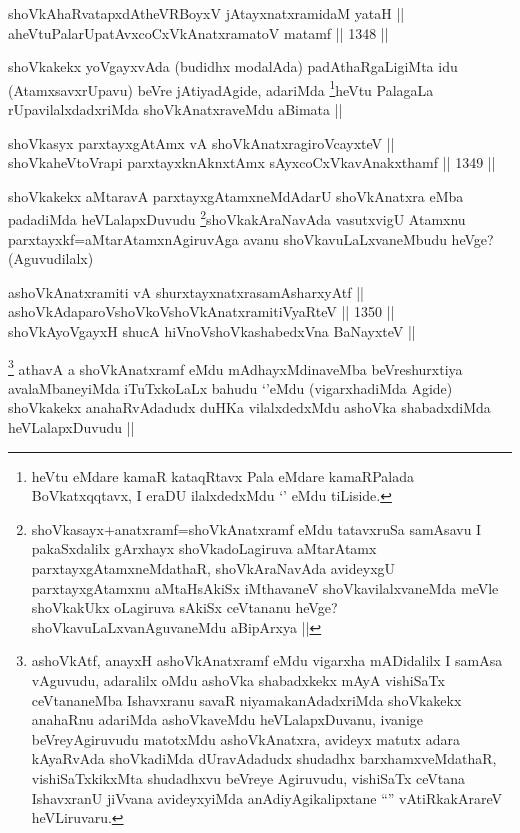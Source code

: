 
\begin{shl}
shoVkAhaRvatapxdAtheVRBoyxV jAtayxnatxramidaM yataH || \\
aheVtuPalarUpatAvxcoCxVkAnatxramatoV matamf ||  1348 ||  
\end{shl}

\begin{artha}
shoVkakekx yoVgayxvAda (budidhx modalAda) padAthaRgaLigiMta idu (AtamxsavxrUpavu) beVre jAtiyadAgide, adariMda \footnote{heVtu eMdare kamaR kataqRtavx Pala eMdare kamaRPalada BoVkatxqqtavx, I eraDU ilalxdedxMdu `\stext' eMdu tiLiside.}heVtu PalagaLa rUpavilalxdadxriMda shoVkAnatxraveMdu aBimata ||
\end{artha}


\begin{shl}
shoVkasyx parxtayxgAtAmx vA shoVkAnatxragiroVcayxteV || \\
shoVkaheVtoVrapi parxtayxknAknxtAmx sAyxcoCxVkavAnakxthamf ||  1349 ||  
\end{shl}

\begin{artha}
shoVkakekx aMtaravA parxtayxgAtamxneMdAdarU shoVkAnatxra eMba padadiMda heVLalapxDuvudu \footnote{shoVkasayx+anatxramf=shoVkAnatxramf eMdu tatavxruSa samAsavu I pakaSxdalilx gArxhayx shoVkadoLagiruva aMtarAtamx parxtayxgAtamxneMdathaR, shoVkAraNavAda avideyxgU parxtayxgAtamxnu aMtaHsAkiSx iMthavaneV shoVkavilalxvaneMda meVle shoVkakUkx oLagiruva sAkiSx  ceVtananu heVge? shoVkavuLaLxvanAguvaneMdu aBipArxya ||}shoVkakAraNavAda vasutxvigU Atamxnu parxtayxkf=aMtarAtamxnAgiruvAga avanu shoVkavuLaLxvaneMbudu heVge? (Aguvudilalx)
\end{artha}


\begin{shl}
ashoVkAnatxramiti vA shurxtayxnatxrasamAsharxyAtf ||  \\
ashoVkAdaparoV\s shoVkoV\s shoVkAnatxramitiVyaRteV ||  1350 ||  \\
shoVkAyoVgayxH shucA hiVnoV\s shoVkashabedxVna BaNayxteV || 
\end{shl}

\begin{artha}
\footnote{ashoVkAtf, anayxH ashoVkAnatxramf eMdu vigarxha mADidalilx I samAsa vAguvudu, adaralilx oMdu ashoVka shabadxkekx mAyA vishiSaTx ceVtananeMba Ishavxranu savaR niyamakanAdadxriMda shoVkakekx anahaRnu adariMda ashoVkaveMdu heVLalapxDuvanu, ivanige beVreyAgiruvudu matotxMdu ashoVkAnatxra, avideyx matutx adara kAyaRvAda shoVkadiMda dUravAdadudx shudadhx barxhamxveMdathaR, vishiSaTxkikxMta shudadhx\-vu beVreye Agiruvudu, vishiSaTx ceVtana IshavxranU jiVvana avideyxyiMda anAdiyAgikalipxtane ``\stext'' vAtiRkakArareV heVLiruvaru.}
athavA a shoVkAnatxramf eMdu mAdhayxMdinaveMba beVreshurxtiya avalaMbaneyiMda iTuTxkoLaLx bahudu `\stext'eMdu (vigarxhadiMda Agide) shoVkakekx anahaRvAdadudx duHKa vilalxdedxMdu ashoVka shabadxdiMda heVLalapxDuvudu ||
\end{artha}

